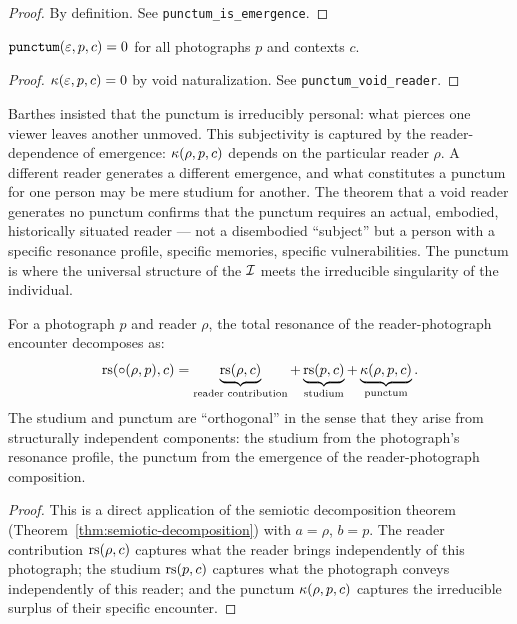 \begin{proof}
By definition. See \texttt{punctum\_is\_emergence}.
\end{proof}

\begin{theorem}
\label{thm:punctum-requires-reader}
$\texttt{punctum}(\varepsilon, p, c) = 0$ for all photographs $p$ and
contexts $c$.
\end{theorem}

\begin{proof}
$\kappa(\varepsilon, p, c) = 0$ by void naturalization. See
\texttt{punctum\_void\_reader}.
\end{proof}

\begin{interpretation}
Barthes insisted that the punctum is irreducibly personal: what
pierces one viewer leaves another unmoved. This subjectivity is
captured by the reader-dependence of emergence: $\kappa(\rho, p, c)$
depends on the particular reader $\rho$. A different reader generates
a different emergence, and what constitutes a punctum for one person
may be mere studium for another. The theorem that a void reader
generates no punctum confirms that the punctum requires an actual,
embodied, historically situated reader --- not a disembodied
``subject'' but a person with a specific resonance profile, specific
memories, specific vulnerabilities. The punctum is where the
universal structure of the $\mathcal{I}$ meets the irreducible singularity
of the individual.
\end{interpretation}

\begin{theorem}
\label{thm:studium-punctum-orthogonal}
For a photograph $p$ and reader $\rho$, the total resonance of the reader-photograph encounter decomposes as:
\[
  \mathrm{rs}(\circ(\rho, p), c) = \underbrace{\mathrm{rs}(\rho, c)}_{\text{reader contribution}} + \underbrace{\mathrm{rs}(p, c)}_{\text{studium}} + \underbrace{\kappa(\rho, p, c)}_{\text{punctum}}.
\]
The studium and punctum are ``orthogonal'' in the sense that they arise from structurally independent components: the studium from the photograph's resonance profile, the punctum from the emergence of the reader-photograph composition.
\end{theorem}

\begin{proof}
This is a direct application of the semiotic decomposition theorem (Theorem~\ref{thm:semiotic-decomposition}) with $a = \rho$, $b = p$. The reader contribution $\mathrm{rs}(\rho, c)$ captures what the reader brings independently of this photograph; the studium $\mathrm{rs}(p, c)$ captures what the photograph conveys independently of this reader; and the punctum $\kappa(\rho, p, c)$ captures the irreducible surplus of their specific encounter.
\end{proof}


